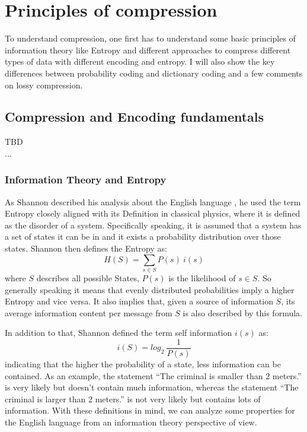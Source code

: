 
\chapter{Principles of compression}
\label{ch:Principles of compression}

To understand compression, one first has to understand some basic principles of information theory like Entropy and different approaches to compress different types of data with different encoding and entropy. I will also show the key differences between probability coding and dictionary coding and a few comments on lossy compression.

\section{Compression and Encoding fundamentals}
\label{ch:Principles of compression:sec:Compression}
TBD\\
...

\subsection{Information Theory and Entropy}
\par{
As Shannon described his analysis about the English language \cite{entropy}, he used the term Entropy closely aligned with its Definition in classical physics, where it is defined as the disorder of a system. Specifically speaking, it is assumed that a system has a set of states it can be in and it exists a probability distribution over those states. Shannon then defines the Entropy as:
\[
H(S) = \sum_{s \in S} P(s) \: i(s)
\]
where $S$ describes all possible States, $P(s)$ is the likelihood of $s \in S$. So generally speaking it means that evenly distributed probabilities imply a higher Entropy and vice versa.
It also implies that, given a source of information $S$, its average information content per message from $S$ is also described by this formula.}

\par{
In addition to that, Shannon defined the term self information $i(s)$ as:
\[
i(S) = log_{2} \: \frac{1}{P(s)}
\]
indicating that the higher the probability of a state, less information can be contained. As an example, the statement \enquote{The criminal is smaller than 2 meters.} is very likely but doesn't contain much information, whereas the statement \enquote{The criminal is larger than 2 meters.} is not very likely but contains lots of information. With these definitions in mind, we can analyze some properties for the English language from an information theory perspective of view.
}

